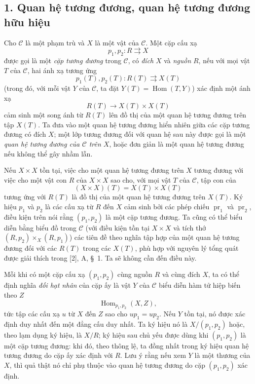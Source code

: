 \subsection*{1. Quan hệ tương đương, quan hệ tương đương hữu hiệu}

Cho $\mathcal C$ là một phạm trù và $X$ là một vật của $\mathcal C$. Một cặp
cấu xạ
\[
  p_1,p_2:R\rightrightarrows X
\]
được gọi là một \emph{cặp tương đương} trong $\mathcal C$, có \emph{đích}
$X$ và \emph{nguồn} $R$, nếu với mọi vật $T$ của $\mathcal C$, hai ánh xạ
tương ứng
\[
  p_1(T),p_2(T):R(T)\rightrightarrows X(T)
\]
(trong đó, với mỗi vật $Y$ của $\mathcal C$, ta đặt
$Y(T)=\operatorname{Hom}(T,Y)$) xác định một ánh xạ
\[
  R(T)\longrightarrow X(T)\times X(T)
\]
cảm sinh một song ánh từ $R(T)$ lên đồ thị của một quan hệ tương đương trên
tập $X(T)$. Ta đưa vào một quan hệ tương đương hiển nhiên giữa các cặp tương
đương có đích $X$; một lớp tương đương đối với quan hệ sau này được gọi là
một \emph{quan hệ tương đương của $\mathcal C$ trên $X$}, hoặc đơn giản là
một quan hệ tương đương nếu không thể gây nhầm lẫn.

Nếu $X\times X$ tồn tại, việc cho một quan hệ tương đương trên $X$ tương
đương với việc cho một vật con $R$ của $X\times X$ sao cho, với mọi vật $T$
của $\mathcal C$, tập con của
\[
  (X\times X)(T)=X(T)\times X(T)
\]
tương ứng với $R(T)$ là đồ thị của một quan hệ tương đương trên $X(T)$. Ký
hiệu $p_1$ và $p_2$ là các cấu xạ từ $R$ đến $X$ cảm sinh bởi các phép chiếu
$\operatorname{pr}_1$ và $\operatorname{pr}_2$, điều kiện trên nói rằng
$(p_1,p_2)$ là một cặp tương đương. Ta cũng có thể biểu diễn bằng biểu đồ
trong $\mathcal C$ (với điều kiện tồn tại $X\times X$ và tích thớ
$(R,p_2)\times_X(R,p_1)$) các tiên đề theo nghĩa tập hợp của một quan hệ
tương đương đối với các $R(T)$ trong các $X(T)$, phù hợp với nguyên lý tổng
quát được giải thích trong [2], A, \S~1. Ta sẽ không cần đến điều này.

Mỗi khi có một cặp cấu xạ $(p_1,p_2)$ cùng nguồn $R$ và cùng đích $X$, ta có
thể định nghĩa \emph{đối hạt nhân} của cặp ấy là vật $Y$ của $\mathcal C$
biểu diễn hàm tử hiệp biến theo $Z$
\[
  \operatorname{Hom}_{p_1,p_2}(X,Z),
\]
tức tập các cấu xạ $u$ từ $X$ đến $Z$ sao cho $up_1=up_2$. Nếu $Y$ tồn tại,
nó được xác định duy nhất đến một đẳng cấu duy nhất. Ta ký hiệu nó là
$X/(p_1,p_2)$ hoặc, theo lạm dụng ký hiệu, là $X/R$; ký hiệu sau chủ yếu được
dùng khi
$(p_1,p_2)$ là một cặp tương đương: khi đó, theo thông lệ, ta đồng
nhất trong ký hiệu quan hệ tương đương do cặp ấy xác định với $R$. Lưu ý rằng
nếu xem $Y$ là một thương của $X$, thì quả thật nó chỉ phụ thuộc vào quan hệ
tương đương do cặp $(p_1,p_2)$ xác định.

